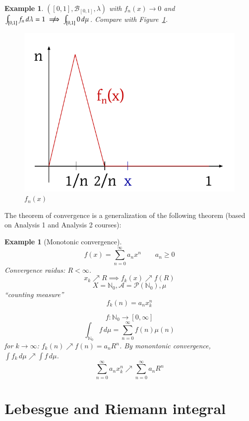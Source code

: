 \documentclass[a4paper]{article}
\newcounter{lecref}[section]
\numberwithin{lecref}{section}
\theoremstyle{break}
\newtheorem{example}[lecref]{Example}
\begin{document}
\begin{example}
  $([0, 1], \mathcal B_{[0,1]}, \lambda)$ with $f_n(x) \to 0$ and $\int_{[0,1]} f_n \, d\lambda = 1 \centernot{\implies} \int_{[0,1]} 0 \, d\mu$.
  Compare with Figure~\ref{img:exconv}.

  \begin{figure}
    \begin{center}
      \includegraphics{img/03_convergence.pdf}
      \caption{$f_n(x)$}
      \label{img:exconv}
    \end{center}
  \end{figure}
\end{example}

The theorem of convergence is a generalization of the following theorem (based on Analysis 1 and Analysis 2 courses):

\begin{example}[Monotonic convergence]
  \[ f(x) = \sum_{n=0}^\infty a_n x^n \qquad a_n \geq 0 \]
  Convergence raidus: $R < \infty$.
  \[ x_k \nearrow R \implies f_k(x) \nearrow f(R) \]
  \[ X = \mathbb N_0, \mathcal A = \mathcal P(\mathbb N_0), \mu \]
  \enquote{counting measure}
  \[ f_k(n) = a_n x_k^n \]

  \[ f: \mathbb N_0 \to [0, \infty] \]
  \[ \int_{\mathbb N_0} f \, d\mu = \sum_{n=0}^\infty f(n) \mu(n) \]
  for $k \to \infty$: $f_k(n) \nearrow f(n) = a_n R^n$.
  By monontonic convergence, $\int f_k \, d\mu \nearrow \int f \, d\mu$.
  \[ \sum_{n=0}^\infty a_n x_k^n \nearrow \sum_{n=0}^\infty a_n R^n \]
\end{example}

\section{Lebesgue and Riemann integral}
\end{document}
